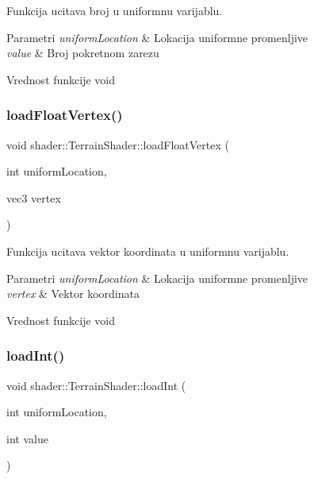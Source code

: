 Funkcija ucitava broj u uniformnu varijablu. 


\begin{DoxyParams}{Parametri}
{\em uniform\+Location} & Lokacija uniformne promenljive \\
\hline
{\em value} & Broj pokretnom zarezu \\
\hline
\end{DoxyParams}
\begin{DoxyReturn}{Vrednost funkcije}
void 
\end{DoxyReturn}
\mbox{\label{classshader_1_1TerrainShader_aa980b906e1d8b02a1427fea028750e14}} 
\subsubsection{\texorpdfstring{load\+Float\+Vertex()}{loadFloatVertex()}}
{\footnotesize\ttfamily void shader\+::\+Terrain\+Shader\+::load\+Float\+Vertex (\begin{DoxyParamCaption}\item[{int}]{uniform\+Location,  }\item[{vec3}]{vertex }\end{DoxyParamCaption})}



Funkcija ucitava vektor koordinata u uniformnu varijablu. 


\begin{DoxyParams}{Parametri}
{\em uniform\+Location} & Lokacija uniformne promenljive \\
\hline
{\em vertex} & Vektor koordinata \\
\hline
\end{DoxyParams}
\begin{DoxyReturn}{Vrednost funkcije}
void 
\end{DoxyReturn}
\mbox{\label{classshader_1_1TerrainShader_ae4ccafdcc22f15cdbc104d416decd294}} 
\subsubsection{\texorpdfstring{load\+Int()}{loadInt()}}
{\footnotesize\ttfamily void shader\+::\+Terrain\+Shader\+::load\+Int (\begin{DoxyParamCaption}\item[{int}]{uniform\+Location,  }\item[{int}]{value }\end{DoxyParamCaption})}



